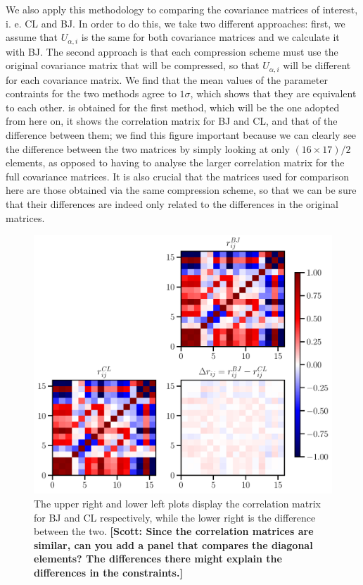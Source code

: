 \documentclass[twocolumn]{\docclass}
\newcommand\scott[1]{{\bf [Scott: #1]}}
\begin{document}
	We also apply this methodology to comparing the covariance matrices of interest, i. e. CL and BJ. In order to do this, we take two different approaches: first, we assume that $U_{\alpha, i}$ is the same for both covariance matrices and we calculate it with BJ. The second approach is that each compression scheme must use the original covariance matrix that will be compressed, so that $U_{\alpha, i}$ will be different for each covariance matrix. We find that the mean values of the parameter contraints for the two methods agree to $1 \sigma$, which shows that they are equivalent to each other.  is obtained for the first method, which will be the one adopted from here on, it shows the correlation matrix for BJ and CL, and that of the difference between them; we find this figure important because we can clearly see the difference between the two matrices by simply looking at only $(16 \times 17)/2$ elements, as opposed to having to analyse the larger correlation matrix for the full covariance matrices. It is also crucial that the matrices used for comparison here are those obtained via the same compression scheme, so that we can be sure that their differences are indeed only related to the differences in the original matrices.
	
	
	\begin{figure}
		\includegraphics[width=0.9\columnwidth]{Correlation_compression.pdf}
		\caption{The upper right and lower left plots display the correlation matrix for BJ and CL respectively, while the lower right is the difference between the two. \scott{Since the correlation matrices are similar, can you add a panel that compares the diagonal elements? The differences there might explain the differences in the constraints.} \label{fig:correlation}}
	\end{figure}
	
\end{document}
